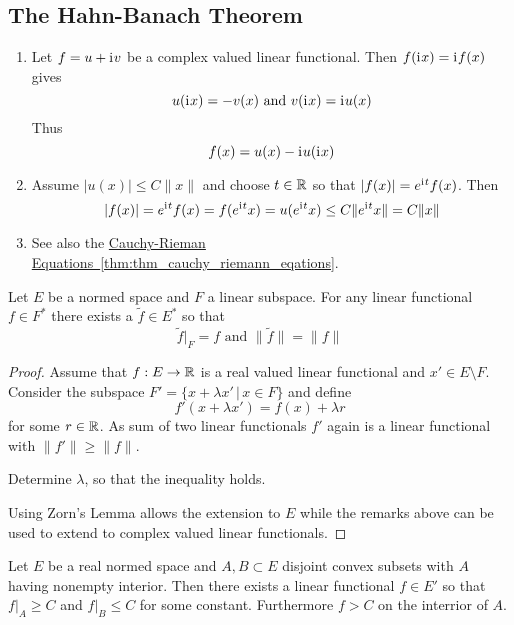 \subsection{The Hahn-Banach Theorem}
\bigskip

\begin{remarks}
    \hfill
    \begin{enumerate}
        \item Let \( f = u + \mathrm{i}\mkern1mu v\) be a complex valued linear functional.
              Then \( f(\mathrm{i}\mkern1mu x) = \mathrm{i}\mkern1mu f(x) \) gives \[
                  u(\mathrm{i}\mkern1mu x) = -v(x) \text{ and } v(\mathrm{i}\mkern1mu x) = \mathrm{i}\mkern1mu u(x)
              \]
              Thus \[
                  f(x) = u(x) - \mathrm{i}\mkern1mu u(\mathrm{i}\mkern1mu x)
              \]
        \item Assume \( |u(x)| \le C\|x\| \) and choose \( t \in \mathbb{R} \) so that \( |f(x)| = e^{\mathrm{i}\mkern1mu t}f(x) \).
              Then \[
                  |f(x)| = e^{\mathrm{i}\mkern1mu t}f(x) = f(e^{\mathrm{i}\mkern1mu t}x) = u(e^{\mathrm{i}\mkern1mu t}x) \le C\|e^{\mathrm{i}\mkern1mu t}x\| = C\|x\|
              \]
        \item See also the \hyperref[thm:thm_cauchy_riemann_eqations]{Cauchy-Rieman Equations~\ref*{thm:thm_cauchy_riemann_eqations}}.
    \end{enumerate}
\end{remarks}
\bigskip


\begin{theorem}\label{thm:hahn_banach}
    Let \( E \) be a normed space and \( F \) a linear subspace. For any linear functional
    \( f \in F^* \) there exists a \( \tilde{f} \in E^* \) so that
    \[
        \tilde{f}|_F = f \text{ and } \|\tilde{f}\| = \|f\|
    \]
\end{theorem}

\begin{proof}
    Assume that \( f: E \to \mathbb{R} \) is a real valued linear functional and \( x' \in E \setminus F \).
    Consider the subspace \( F' = \{x + \lambda x' \,|\, x \in F \} \) and define
    \[
        f'(x + \lambda x') = f(x) + \lambda r
    \]
    for some \( r \in \mathbb{R} \).  As sum of two linear functionals \( f' \) again is a linear functional with
    \( \|f'\| \ge \|f\| \).

    Determine \( \lambda \), so that the inequality holds.

    Using Zorn's Lemma allows the extension to \( E \) while the remarks above can be used to extend
    to complex valued linear functionals.
\end{proof}
\bigskip


\begin{theorem}\label{thm:separation}
    Let \( E \) be a real normed space and \( A, B \subset E \) disjoint convex subsets with \( A \)
    having nonempty interior. Then there exists a linear functional \( f \in E' \) so that \( f|_A \ge C \)
    and \( f|_B \le C \) for some constant. Furthermore \( f > C \) on the interrior of \( A \).

\end{theorem}

